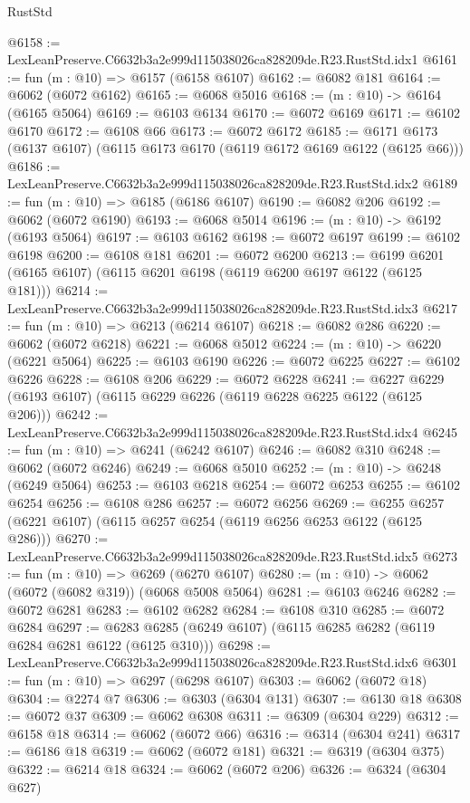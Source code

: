 \begin{lexlean}{RustStd}
\begin{coremodule}
@6158 := LexLeanPreserve.C6632b3a2e999d115038026ca828209de.R23.RustStd.idx1
@6161 := fun (m : @10) => @6157 (@6158 @6107)
@6162 := @6082 @181
@6164 := @6062 (@6072 @6162)
@6165 := @6068 @5016
@6168 := (m : @10) -> @6164 (@6165 @5064)
@6169 := @6103 @6134
@6170 := @6072 @6169
@6171 := @6102 @6170
@6172 := @6108 @66
@6173 := @6072 @6172
@6185 := @6171 @6173 (@6137 @6107) (@6115 @6173 @6170 (@6119 @6172 @6169 @6122 (@6125 @66)))
@6186 := LexLeanPreserve.C6632b3a2e999d115038026ca828209de.R23.RustStd.idx2
@6189 := fun (m : @10) => @6185 (@6186 @6107)
@6190 := @6082 @206
@6192 := @6062 (@6072 @6190)
@6193 := @6068 @5014
@6196 := (m : @10) -> @6192 (@6193 @5064)
@6197 := @6103 @6162
@6198 := @6072 @6197
@6199 := @6102 @6198
@6200 := @6108 @181
@6201 := @6072 @6200
@6213 := @6199 @6201 (@6165 @6107) (@6115 @6201 @6198 (@6119 @6200 @6197 @6122 (@6125 @181)))
@6214 := LexLeanPreserve.C6632b3a2e999d115038026ca828209de.R23.RustStd.idx3
@6217 := fun (m : @10) => @6213 (@6214 @6107)
@6218 := @6082 @286
@6220 := @6062 (@6072 @6218)
@6221 := @6068 @5012
@6224 := (m : @10) -> @6220 (@6221 @5064)
@6225 := @6103 @6190
@6226 := @6072 @6225
@6227 := @6102 @6226
@6228 := @6108 @206
@6229 := @6072 @6228
@6241 := @6227 @6229 (@6193 @6107) (@6115 @6229 @6226 (@6119 @6228 @6225 @6122 (@6125 @206)))
@6242 := LexLeanPreserve.C6632b3a2e999d115038026ca828209de.R23.RustStd.idx4
@6245 := fun (m : @10) => @6241 (@6242 @6107)
@6246 := @6082 @310
@6248 := @6062 (@6072 @6246)
@6249 := @6068 @5010
@6252 := (m : @10) -> @6248 (@6249 @5064)
@6253 := @6103 @6218
@6254 := @6072 @6253
@6255 := @6102 @6254
@6256 := @6108 @286
@6257 := @6072 @6256
@6269 := @6255 @6257 (@6221 @6107) (@6115 @6257 @6254 (@6119 @6256 @6253 @6122 (@6125 @286)))
@6270 := LexLeanPreserve.C6632b3a2e999d115038026ca828209de.R23.RustStd.idx5
@6273 := fun (m : @10) => @6269 (@6270 @6107)
@6280 := (m : @10) -> @6062 (@6072 (@6082 @319)) (@6068 @5008 @5064)
@6281 := @6103 @6246
@6282 := @6072 @6281
@6283 := @6102 @6282
@6284 := @6108 @310
@6285 := @6072 @6284
@6297 := @6283 @6285 (@6249 @6107) (@6115 @6285 @6282 (@6119 @6284 @6281 @6122 (@6125 @310)))
@6298 := LexLeanPreserve.C6632b3a2e999d115038026ca828209de.R23.RustStd.idx6
@6301 := fun (m : @10) => @6297 (@6298 @6107)
@6303 := @6062 (@6072 @18)
@6304 := @2274 @7
@6306 := @6303 (@6304 @131)
@6307 := @6130 @18
@6308 := @6072 @37
@6309 := @6062 @6308
@6311 := @6309 (@6304 @229)
@6312 := @6158 @18
@6314 := @6062 (@6072 @66)
@6316 := @6314 (@6304 @241)
@6317 := @6186 @18
@6319 := @6062 (@6072 @181)
@6321 := @6319 (@6304 @375)
@6322 := @6214 @18
@6324 := @6062 (@6072 @206)
@6326 := @6324 (@6304 @627)

\end{coremodule}
\end{lexlean}
